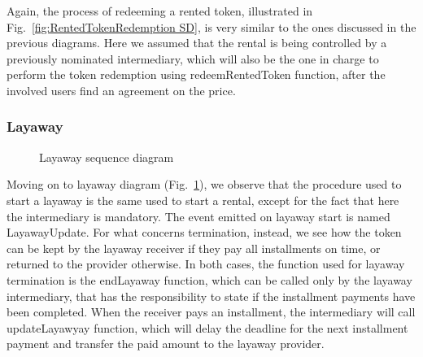 \documentclass[english, LaM, oneside]{sapthesis}%
\begin{document}
Again, the process of redeeming a rented token, illustrated in Fig.~\ref{fig:RentedTokenRedemption SD}, is very similar to the ones discussed in the previous diagrams. Here we assumed that the rental is being controlled by a previously nominated intermediary, which will also be the one in charge to perform the token redemption using redeemRentedToken function, after the involved users find an agreement on the price.\newline
\bigskip

\subsubsection{Layaway}

\begin{figure}[H]
    \centering
        \begin{adjustbox}{width=1\textwidth}
        \end{adjustbox}
    \caption{Layaway sequence diagram}
    \label{fig:Layaway SD}
\end{figure}

Moving on to layaway diagram (Fig.~\ref{fig:Layaway SD}), we observe that the procedure used to start a layaway is the same used to start a rental, except for the fact that here the intermediary is mandatory. The event emitted on layaway start is named LayawayUpdate. For what concerns termination, instead, we see how the token can be kept by the layaway receiver if they pay all installments on time, or returned to the provider otherwise. In both cases, the function used for layaway termination is the endLayaway function, which can be called only by the layaway intermediary, that has the responsibility to state if the installment payments have been completed.\newline
When the receiver pays an installment, the intermediary will call updateLayawyay function, which will delay the deadline for the next installment payment and transfer the paid amount to the layaway provider.
\end{document}
